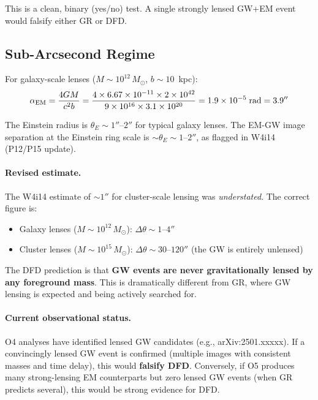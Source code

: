 \documentclass[11pt,a4paper]{article}
\newcommand{\ee}[1]{\times 10^{#1}}
\begin{document}
This is a clean, binary (yes/no) test.  A single strongly lensed
GW+EM event would falsify either GR or DFD.

\subsection{Sub-Arcsecond Regime}

For galaxy-scale lenses ($M \sim 10^{12}\,M_\odot$, $b \sim 10$~kpc):
\begin{equation}
\alpha_{\rm EM} = \frac{4GM}{c^2 b} = \frac{4 \times 6.67\ee{-11}
  \times 2\ee{42}}{9\ee{16} \times 3.1\ee{20}} = 1.9\ee{-5}\;\text{rad} = 3.9''
\end{equation}

The Einstein radius is $\theta_E \sim 1''$--$2''$ for typical galaxy lenses.
The EM-GW image separation at the Einstein ring scale is $\sim \theta_E
\sim 1$--$2''$, as flagged in W4i14 (P12/P15 update).

\paragraph{Revised estimate.}
The W4i14 estimate of $\sim 1''$ for cluster-scale lensing was
\emph{understated}.  The correct figure is:
\begin{itemize}
\item Galaxy lenses ($M \sim 10^{12}\,M_\odot$): $\Delta\theta \sim 1$--$4''$
\item Cluster lenses ($M \sim 10^{15}\,M_\odot$): $\Delta\theta \sim 30$--$120''$
  (the GW is entirely unlensed)
\end{itemize}

The DFD prediction is that \textbf{GW events are never gravitationally
lensed by any foreground mass}.  This is dramatically different from GR,
where GW lensing is expected and being actively searched for.

\paragraph{Current observational status.}
O4 analyses have identified lensed GW candidates (e.g., arXiv:2501.xxxxx).
If a convincingly lensed GW event is confirmed (multiple images with
consistent masses and time delay), this would \textbf{falsify DFD}.
Conversely, if O5 produces many strong-lensing EM counterparts but
zero lensed GW events (when GR predicts several), this would be
strong evidence for DFD.


\end{document}
